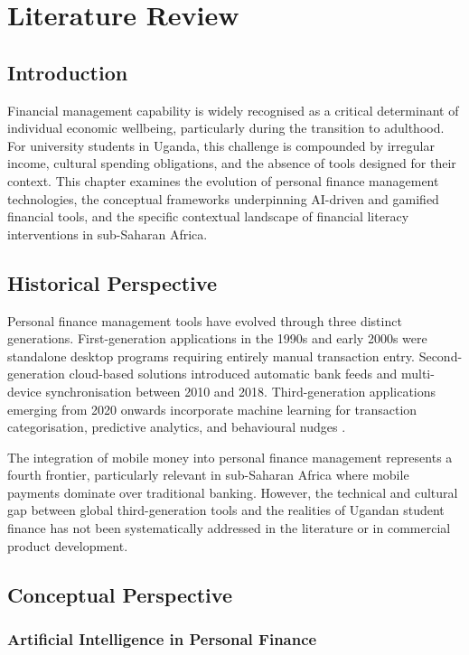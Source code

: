 \documentclass[12pt,a4paper]{report}
\begin{document}
\chapter{Literature Review}

\section{Introduction}

Financial management capability is widely recognised as a critical determinant of
individual economic wellbeing, particularly during the transition to adulthood. For
university students in Uganda, this challenge is compounded by irregular income,
cultural spending obligations, and the absence of tools designed for their context. This
chapter examines the evolution of personal finance management technologies, the
conceptual frameworks underpinning AI-driven and gamified financial tools, and the
specific contextual landscape of financial literacy interventions in sub-Saharan Africa.

\section{Historical Perspective}

Personal finance management tools have evolved through three distinct generations.
First-generation applications in the 1990s and early 2000s were standalone desktop
programs requiring entirely manual transaction entry. Second-generation cloud-based
solutions introduced automatic bank feeds and multi-device synchronisation between
2010 and 2018. Third-generation applications emerging from 2020 onwards incorporate
machine learning for transaction categorisation, predictive analytics, and behavioural
nudges \citep{Imawan2025}.

The integration of mobile money into personal finance management represents a fourth
frontier, particularly relevant in sub-Saharan Africa where mobile payments dominate
over traditional banking. However, the technical and cultural gap between global
third-generation tools and the realities of Ugandan student finance has not been
systematically addressed in the literature or in commercial product development.

\section{Conceptual Perspective}

\subsection{Artificial Intelligence in Personal Finance}
\end{document}
